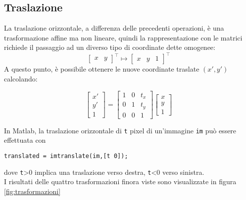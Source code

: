 \subsection{Traslazione}
La traslazione orizzontale, a differenza delle precedenti operazioni, è una trasformazione affine ma non lineare, quindi
la rappresentazione con le matrici richiede il passaggio ad un diverso tipo di coordinate
dette omogenee:
\begin{equation*}
\begin{bmatrix}
x&y
\end{bmatrix}^\top \mapsto
\begin{bmatrix}
x&y&1
\end{bmatrix}^\top
\end{equation*}
A questo punto, è possibile ottenere le nuove coordinate traslate $(x', y')$ calcolando:

\begin{equation*}
\begin{bmatrix}
x'\\y'\\1
\end{bmatrix} = 
\begin{bmatrix}
1 & 0 & t_x \\0 & 1 & t_y \\0 & 0 & 1
\end{bmatrix}
\begin{bmatrix}
x \\ y \\ 1
\end{bmatrix}
\end{equation*}

In Matlab, la traslazione orizzontale di \verb|t| pixel di un'immagine \verb|im| può essere effettuata con
\begin{verbatim}
translated = imtranslate(im,[t 0]);
\end{verbatim}
dove \verb|t|>0 implica una traslazione verso destra, \verb|t|<0 verso sinistra.\\

I risultati delle quattro trasformazioni finora viste sono visualizzate in figura \ref{fig:trasformazioni}

